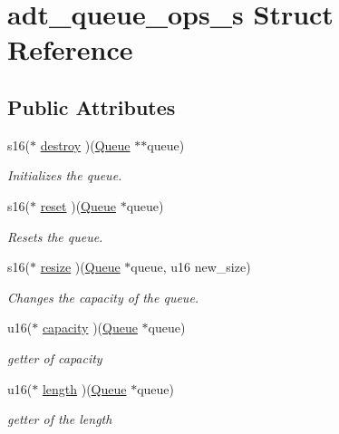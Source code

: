 \hypertarget{structadt__queue__ops__s}{}\section{adt\+\_\+queue\+\_\+ops\+\_\+s Struct Reference}
\label{structadt__queue__ops__s}
\subsection*{Public Attributes}
\begin{DoxyCompactItemize}
\item 
s16($\ast$ \hyperlink{structadt__queue__ops__s_acaf2cfe4ce1d1d5acb1f39ebcd56d8a1}{destroy} )(\hyperlink{structadt__queue__s}{Queue} $\ast$$\ast$queue)
\begin{DoxyCompactList}\small\item\em Initializes the queue. \end{DoxyCompactList}\item 
s16($\ast$ \hyperlink{structadt__queue__ops__s_aa3cfb116ee706ee5dfc066ef075f5182}{reset} )(\hyperlink{structadt__queue__s}{Queue} $\ast$queue)
\begin{DoxyCompactList}\small\item\em Resets the queue. \end{DoxyCompactList}\item 
s16($\ast$ \hyperlink{structadt__queue__ops__s_a21c88cc6f73093960ac29db7ff2b4872}{resize} )(\hyperlink{structadt__queue__s}{Queue} $\ast$queue, u16 new\+\_\+size)
\begin{DoxyCompactList}\small\item\em Changes the capacity of the queue. \end{DoxyCompactList}\item 
u16($\ast$ \hyperlink{structadt__queue__ops__s_a20023ce21822af2b1ab21ec25d4050be}{capacity} )(\hyperlink{structadt__queue__s}{Queue} $\ast$queue)
\begin{DoxyCompactList}\small\item\em getter of capacity \end{DoxyCompactList}\item 
u16($\ast$ \hyperlink{structadt__queue__ops__s_aae563dcc78fe992c354c9e1151dfcbbb}{length} )(\hyperlink{structadt__queue__s}{Queue} $\ast$queue)
\begin{DoxyCompactList}\small\item\em getter of the length \end{DoxyCompactList}\item 
$$
\end{DoxyCompactItemize}
